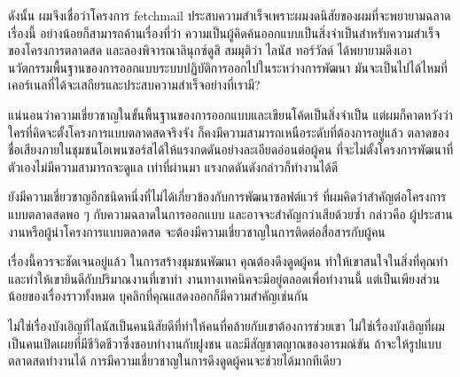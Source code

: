 ดังนั้น ผมจึงเชื่อว่าโครงการ fetchmail
ประสบความสำเร็จเพราะผมงดนิสัยของผมที่จะพยายามฉลาด เรื่องนี้
อย่างน้อยก็สามารถค้านเรื่องที่ว่า
ความเป็นผู้คิดค้นออกแบบเป็นสิ่งจำเป็นสำหรับความสำเร็จของโครงการตลาดสด
และลองพิจารณาลินุกซ์ดูสิ สมมุติว่า ไลนัส ทอร์วัลด์
ได้พยายามดึงเอานวัตกรรมพื้นฐานของการออกแบบระบบปฏิบัติการออกไปในระหว่างการพัฒนา
มันจะเป็นไปได้ไหมที่เคอร์เนลที่ได้จะเสถียรและประสบความสำเร็จอย่างที่เรามี?

แน่นอนว่าความเชี่ยวชาญในขั้นพื้นฐานของการออกแบบและเขียนโค้ดเป็นสิ่งจำเป็น
แต่ผมก็คาดหวังว่าใครที่คิดจะตั้งโครงการแบบตลาดสดจริงจัง
ก็คงมีความสามารถเหนือระดับที่ต้องการอยู่แล้ว
ตลาดของชื่อเสียงภายในชุมชนโอเพนซอร์สได้ให้แรงกดดันอย่างละเอียดอ่อนต่อผู้คน
ที่จะไม่ตั้งโครงการพัฒนาที่ตัวเองไม่มีความสามารถจะดูแล เท่าที่ผ่านมา
แรงกดดันดังกล่าวก็ทำงานได้ดี

ยังมีความเชี่ยวชาญอีกชนิดหนึ่งที่ไม่ได้เกี่ยวข้องกับการพัฒนาซอฟต์แวร์
ที่ผมคิดว่าสำคัญต่อโครงการแบบตลาดสดพอ ๆ  กับความฉลาดในการออกแบบ
และอาจจะสำคัญกว่าเสียด้วยซ้ำ กล่าวคือ
ผู้ประสานงานหรือผู้นำโครงการแบบตลาดสด
จะต้องมีความเชี่ยวชาญในการติดต่อสื่อสารกับผู้คน

เรื่องนี้ควรจะชัดเจนอยู่แล้ว ในการสร้างชุมชนพัฒนา คุณต้องดึงดูดผู้คน
ทำให้เขาสนใจในสิ่งที่คุณทำ และทำให้เขายินดีกับปริมาณงานที่เขาทำ
งานทางเทคนิคจะมีอยู่ตลอดเพื่อทำงานนี้
แต่เป็นเพียงส่วนน้อยของเรื่องราวทั้งหมด
บุคลิกที่คุณแสดงออกก็มีความสำคัญเช่นกัน

ไม่ใช่เรื่องบังเอิญที่ไลนัสเป็นคนนิสัยดีที่ทำให้คนที่คล้ายกับเขาต้องการช่วยเขา
ไม่ใช่เรื่องบังเอิญที่ผมเป็นคนเปิดเผยที่มีชีวิตชีวาซึ่งชอบทำงานกับฝูงชน
และมีสัญชาตญาณของอารมณ์ขัน ถ้าจะให้รูปแบบตลาดสดทำงานได้
การมีความเชี่ยวชาญในการดึงดูดผู้คนจะช่วยได้มากทีเดียว